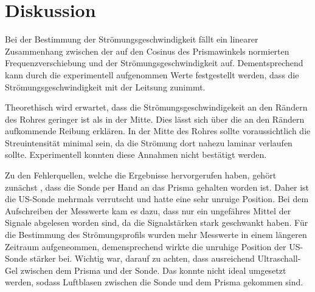\section{Diskussion}
\label{sec:diskussion}

Bei der Bestimmung der Strömungsgeschwindigkeit fällt ein linearer Zusammenhang zwischen
der auf den Cosinus des Prismawinkels normierten Frequenzverschiebung und der Strömungsgeschwindigkeit auf. Dementsprechend kann durch die experimentell 
aufgenommen Werte festgestellt werden, dass die Strömungsgeschwindigkeit mit der Leitsung zunimmt.

Theorethisch wird erwartet, dass die Strömungsgeschwindigekeit an den Rändern des Rohres geringer ist als in der Mitte.
Dies lässt sich über die an den Rändern aufkommende Reibung erklären. In der Mitte des Rohres sollte voraussichtlich
die Streuintensität minimal sein, da die Strömung dort nahezu laminar verlaufen sollte.
Experimentell konnten diese Annahmen nicht bestätigt werden.

Zu den Fehlerquellen, welche die Ergebnisse hervorgerufen haben, gehört zunächst , dass die Sonde per Hand an das Prisma gehalten
worden ist. Daher ist die US-Sonde mehrmals verrutscht und hatte eine sehr unruige Position.
Bei dem Aufschreiben der Messwerte kam es dazu, dass nur ein ungefähres Mittel der Signale abgelesen worden sind, da die 
Signalstärken stark geschwankt haben. Für die Bestimmung des Strömungsprofils wurden mehr Messwerte in einem längeren Zeitraum 
aufgeneommen, demensprechend wirkte die unruhige Position der US-Sonde stärker bei. Wichtig war, darauf zu achten, dass ausreichend
Ultraschall-Gel zwischen dem Prisma und der Sonde. Das konnte nicht ideal umgesetzt werden, sodass Luftblasen zwischen die Sonde
und dem Prisma gekommen sind.